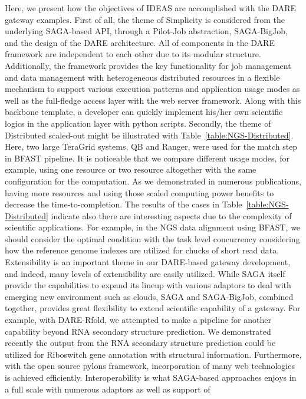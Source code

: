 \documentclass{sig-alternate}
\begin{document}
  
  Here, we present how the objectives of IDEAS are
accomplished with the DARE gateway examples.  First of all, the theme
of Simplicity is considered from the underlying SAGA-based API,
through a Pilot-Job abstraction, SAGA-BigJob, and the design of the
DARE architecture.  All of components in the DARE framework are
independent to each other due to its modular structure.  Additionally,
the framework provides the key functionality for job management and
data management with heterogeneous distributed resources in a flexible
mechanism to support various execution patterns and application usage
modes as well as the full-fledge access layer with the web server
framework.  Along with this backbone template, a developer can quickly
implement his/her own scientific logics in the application layer with
python scripts.  Secondly, the theme of Distributed scaled-out might
be illustrated with Table~\ref{table:NGS-Distributed}.  Here, two
large TeraGrid systems, QB and Ranger, were used for the match step in
BFAST pipeline.  It is noticeable that we compare different usage
modes, for example, using one resource or two resource altogether with
the same configuration for the computation.  As we demonstrated in
numerous publications, having more resources and using those scaled
computing power benefits to decrease the time-to-completion.  The
results of the cases in Table~\ref{table:NGS-Distributed} indicate
also there are interesting aspects due to the complexity of scientific
applications.  For example, in the NGS data alignment using BFAST, we
should consider the optimal condition with the task level concurrency
considering how the reference genome indexes are utilized for chucks
of short read data\cite{ecmls11}.  Extensibility is an important theme
in our DARE-based gateway development, and indeed, many levels of
extensibility are easily utilized.  While SAGA itself provide the
capabilities to expand its lineup with various adaptors to deal with
emerging new environment such as clouds, SAGA and SAGA-BigJob,
combined together, provides great flexibility to extend scientific
capability of a gateway. For example, with DARE-Rfold, we attempted to
make a pipeline for another capability beyond RNA secondary structure
prediction.  We demonstrated recently the output from the RNA
secondary structure prediction could be utilized for Riboswitch gene
annotation with structural information.  Furthermore, with the open
source pylons framework, incorporation of many web technologies is
achieved efficiently.  Interoperability is what SAGA-based approaches
enjoys in a full scale with numerous adaptors as well as support of
\end{document}
